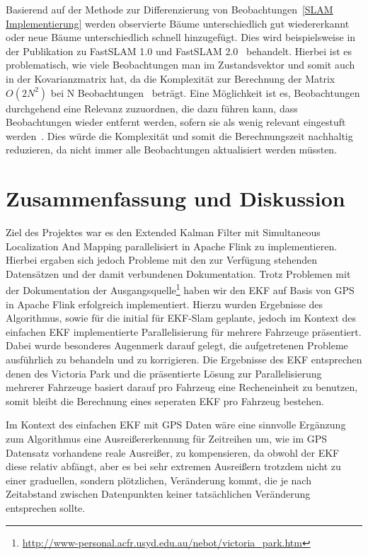 \documentclass[11pt]{article}
\begin{document}
Basierend auf der Methode zur Differenzierung von Beobachtungen~\ref{SLAM Implementierung} werden observierte Bäume unterschiedlich gut wiedererkannt oder neue Bäume unterschiedlich schnell hinzugefügt. Dies wird beispielsweise in der Publikation zu FastSLAM 1.0 und FastSLAM 2.0~\cite{thrun_fastslam_nodate} behandelt. Hierbei ist es problematisch, wie viele Beobachtungen man im Zustandsvektor und somit auch in der Kovarianzmatrix hat, da die Komplexität zur Berechnung der Matrix $O(2N^2)$ bei N Beobachtungen~\cite{ute_SLAM} beträgt. Eine Möglichkeit ist es, Beobachtungen durchgehend eine Relevanz zuzuordnen, die dazu führen kann, dass Beobachtungen wieder entfernt werden, sofern sie als wenig relevant eingestuft werden~\cite{thrun_fastslam_nodate}. Dies würde die Komplexität und somit die Berechnungszeit nachhaltig reduzieren, da nicht immer alle Beobachtungen aktualisiert werden müssten.

\section{Zusammenfassung und Diskussion}\label{Zusammenfassung und Diskussion}
Ziel des Projektes war es den Extended Kalman Filter mit Simultaneous Localization And Mapping parallelisiert in Apache Flink zu implementieren. Hierbei ergaben sich jedoch Probleme mit den zur Verfügung stehenden Datensätzen und der damit verbundenen Dokumentation.
Trotz Problemen mit der Dokumentation der Ausgangsquelle\footnote{\url{http://www-personal.acfr.usyd.edu.au/nebot/victoria_park.htm}} haben wir den EKF auf Basis von GPS in Apache Flink erfolgreich implementiert. Hierzu wurden Ergebnisse des Algorithmus, sowie für die initial für EKF-Slam geplante, jedoch im Kontext des einfachen EKF implementierte Parallelisierung für mehrere Fahrzeuge präsentiert. Dabei wurde besonderes Augenmerk darauf gelegt, die aufgetretenen Probleme ausführlich zu behandeln und zu korrigieren. Die Ergebnisse des EKF entsprechen denen des Victoria Park und die präsentierte Lösung zur Parallelisierung mehrerer Fahrzeuge basiert darauf pro Fahrzeug eine Recheneinheit zu benutzen, somit bleibt die Berechnung eines seperaten EKF pro Fahrzeug bestehen. 

Im Kontext des einfachen EKF mit GPS Daten wäre eine sinnvolle Ergänzung zum Algorithmus eine Ausreißererkennung für Zeitreihen um, wie im GPS Datensatz vorhandene reale Ausreißer, zu kompensieren, da obwohl der EKF diese relativ abfängt, aber es bei sehr extremen Ausreißern trotzdem nicht zu einer graduellen, sondern plötzlichen, Veränderung kommt, die je nach Zeitabstand zwischen Datenpunkten keiner tatsächlichen Veränderung entsprechen sollte.
\end{document}
